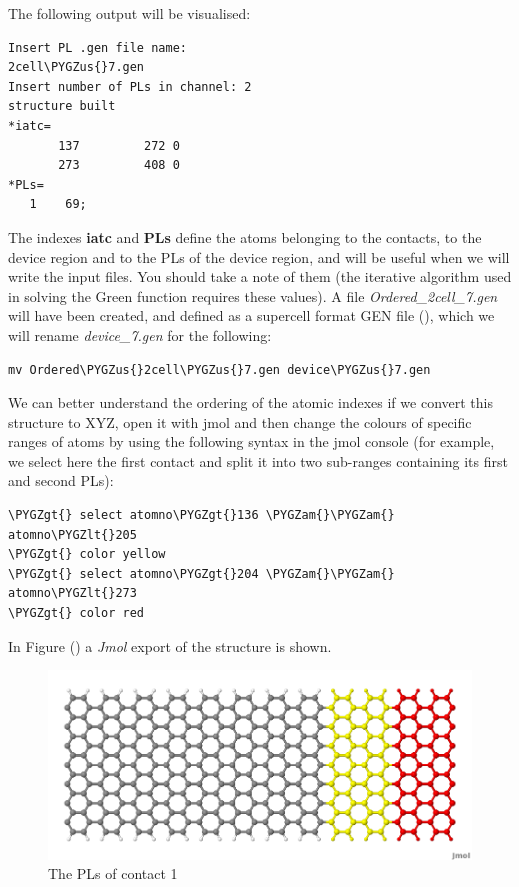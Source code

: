 \documentclass[a4paper,11pt,english]{sphinxmanual}
\def\PYGZus{\char`\_}
\def\PYGZam{\char`\&}
\def\PYGZlt{\char`\<}
\def\PYGZgt{\char`\>}
\begin{document}
{{The following output will be visualised:

\begin{Verbatim}[commandchars=\\\{\}]
Insert PL .gen file name:
2cell\PYGZus{}7.gen
Insert number of PLs in channel: 2
structure built
*iatc=
       137         272 0
       273         408 0
*PLs=
   1    69;
\end{Verbatim}

The indexes \textbf{iatc} and \textbf{PLs} define the atoms belonging to the
contacts, to the device region and to the PLs of the device region,
and will be useful when we will write the input files. You should take
a note of them (the iterative algorithm used in solving the Green
function requires these values). A file \emph{Ordered\_2cell\_7.gen} will
have been created, and defined as a supercell format GEN file (),
which we will rename \emph{device\_7.gen} for the following:

\begin{Verbatim}[commandchars=\\\{\}]
mv Ordered\PYGZus{}2cell\PYGZus{}7.gen device\PYGZus{}7.gen
\end{Verbatim}

We can better
understand the ordering of the atomic indexes if we convert this
structure to XYZ, open it with jmol and then change the colours of
specific ranges of atoms by using the following syntax in the jmol
console (for example, we select here the first contact and split it
into two sub-ranges containing its first and second PLs):

\begin{Verbatim}[commandchars=\\\{\}]
\PYGZgt{} select atomno\PYGZgt{}136 \PYGZam{}\PYGZam{} atomno\PYGZlt{}205
\PYGZgt{} color yellow
\PYGZgt{} select atomno\PYGZgt{}204 \PYGZam{}\PYGZam{} atomno\PYGZlt{}273
\PYGZgt{} color red
\end{Verbatim}

In Figure {\hyperref[transport:fig-color-device-7]{\emph{}}} () a \emph{Jmol} export of the structure is shown.
\begin{figure}[htbp]
\centering
\capstart

\includegraphics[width=0.800\linewidth]{color_device_7.png}
\caption{The PLs of contact 1}\label{transport:fig-color-device-7}\end{figure}

}}
\end{document}

